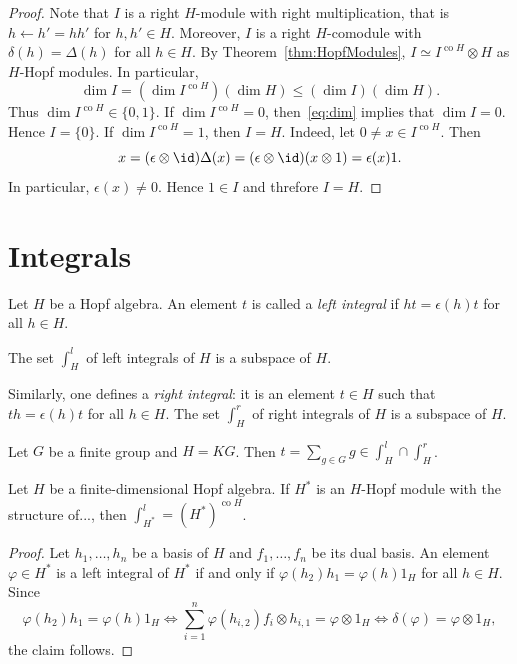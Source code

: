 \begin{proof}
  Note that $I$ is a right $H$-module with
  right multiplication, that is $h\leftarrow h'=hh'$ for $h,h'\in H$. 
  Moreover, 
  $I$ is a right $H$-comodule with $\delta(h)=\Delta(h)$ for all $h\in H$. By Theorem~\ref{thm:HopfModules}, 
  $I\simeq I^{\operatorname{co}H}\otimes H$ 
  as $H$-Hopf modules. In particular, 
  \begin{equation}
    \label{eq:dim}
    \dim I=(\dim I^{\operatorname{co}H})(\dim H)\leq (\dim I)(\dim H).
  \end{equation}
  Thus $\dim I^{\operatorname{co}H}\in\{0,1\}$. If $\dim I^{\operatorname{co}H}=0$, 
  then~\eqref{eq:dim} implies that $\dim I=0$. Hence $I=\{0\}$. If 
  $\dim I^{\operatorname{co}H}=1$, then $I=H$. Indeed, 
  let $0\ne x\in I^{\operatorname{co}H}$. 
  Then 
  \[
    x=(\epsilon\otimes\id)\Delta(x)=(\epsilon\otimes\id)(x\otimes 1)=\epsilon(x)1.
  \]
  In particular, $\epsilon(x)\ne 0$. Hence $1\in I$ and threfore $I=H$. 
\end{proof}

\section{Integrals}

\begin{definition}
  Let $H$ be a Hopf algebra. 
  An element $t$ is called a \emph{left integral} if 
  $ht=\epsilon(h)t$ for all $h\in H$. 
\end{definition}

The set $\int_H^l$ of left integrals of $H$ is a subspace of $H$. 

Similarly, one defines a \emph{right integral}: it is
an element $t\in H$ such that 
$th=\epsilon(h)t$ for all $h\in H$. 
The set $\int_H^r$ of right integrals of $H$ is a subspace of $H$.  

\begin{example}
  Let $G$ be a finite group and 
  $H=KG$. Then $t=\sum_{g\in G}g\in\int_H^l\cap\int_H^r$. 
\end{example}

\begin{proposition}
  \label{pro:dual_op}
  Let $H$ be a finite-dimensional Hopf algebra. 
  If $H^*$ is an $H$-Hopf module with the structure of..., 
  then $\int_{H^*}^l = (H^*)^{\operatorname{co}H}$. 
\end{proposition}

\begin{proof}
  Let $h_1,\dots,h_n$ be a basis of $H$ and $f_1,\dots,f_n$ be its
  dual basis. 
  An element $\varphi\in H^*$ is a left integral of $H^*$ 
  if and only if $\varphi(h_2)h_1=\varphi(h)1_H$ for all $h\in H$. Since 
  \[
  \varphi(h_2)h_1=\varphi(h)1_H\Longleftrightarrow 
  \sum_{i=1}^n\varphi(h_{i,2})f_i\otimes h_{i,1}=\varphi\otimes 1_H
  \Longleftrightarrow \delta(\varphi)=\varphi\otimes 1_H, 
  \]
  the claim follows. 
\end{proof}

